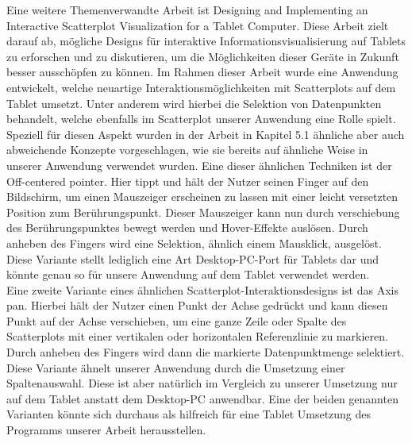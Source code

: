 \documentclass[usegeometry=true]{scrartcl}
\begin{document}
Eine weitere Themenverwandte Arbeit ist \glqq Designing and Implementing an Interactive Scatterplot Visualization for a Tablet Computer\grqq \cite{tablet}. Diese Arbeit zielt darauf ab, mögliche Designs für interaktive Informationsvisualisierung auf Tablets zu erforschen und zu diskutieren, um die Möglichkeiten dieser Geräte in Zukunft besser ausschöpfen zu können. Im Rahmen dieser Arbeit wurde eine Anwendung entwickelt, welche neuartige Interaktionsmöglichkeiten mit Scatterplots auf dem Tablet umsetzt. Unter anderem wird hierbei die Selektion von Datenpunkten behandelt, welche ebenfalls im Scatterplot unserer Anwendung eine Rolle spielt. Speziell für diesen Aspekt wurden in der Arbeit in Kapitel 5.1 ähnliche aber auch abweichende Konzepte vorgeschlagen, wie sie bereits auf ähnliche Weise in unserer Anwendung verwendet wurden. Eine dieser ähnlichen Techniken ist der \glqq Off-centered pointer\grqq. Hier tippt und hält der Nutzer seinen Finger auf den Bildschirm, um einen Mauszeiger erscheinen zu lassen mit einer leicht versetzten Position zum Berührungspunkt. Dieser Mauszeiger kann nun durch verschiebung des Berührungspunktes bewegt werden und Hover-Effekte auslösen. Durch anheben des Fingers wird eine Selektion, ähnlich einem Mausklick, ausgelöst. Diese Variante stellt lediglich eine Art Desktop-PC-Port für Tablets dar und könnte genau so für unsere Anwendung auf dem Tablet verwendet werden.\\ Eine zweite Variante eines ähnlichen Scatterplot-Interaktionsdesigns ist das \glqq Axis pan\grqq. Hierbei hält der Nutzer einen Punkt der Achse gedrückt und kann diesen Punkt auf der Achse verschieben, um eine ganze Zeile oder Spalte des Scatterplots mit einer vertikalen oder horizontalen Referenzlinie zu markieren. Durch anheben des Fingers wird dann die markierte Datenpunktmenge selektiert. Diese Variante ähnelt unserer Anwendung durch die Umsetzung einer Spaltenauswahl. Diese ist aber natürlich im Vergleich zu unserer Umsetzung nur auf dem Tablet anstatt dem Desktop-PC anwendbar. Eine der beiden genannten Varianten könnte sich durchaus als hilfreich für eine Tablet Umsetzung des Programms unserer Arbeit herausstellen.\\
\end{document}
